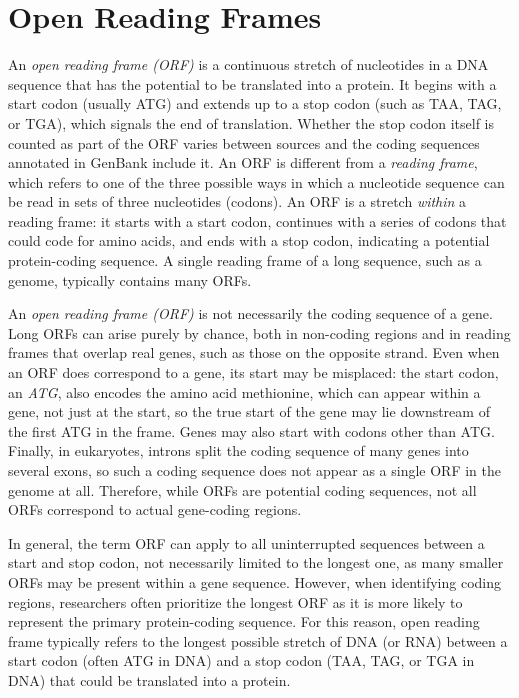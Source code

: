 \section{Open Reading Frames}

An {\em open reading frame (ORF)} is a continuous stretch of nucleotides in a DNA sequence that has the potential to be translated into a protein. It begins with a start codon (usually ATG) and extends up to a stop codon (such as TAA, TAG, or TGA), which signals the end of translation. Whether the stop codon itself is counted as part of the ORF varies between sources and the coding sequences annotated in GenBank include it. An ORF is different from a {\em reading frame}, which refers to one of the three possible ways in which a nucleotide sequence can be read in sets of three nucleotides (codons). An ORF is a stretch {\em within} a reading frame: it starts with a start codon, continues with a series of codons that could code for amino acids, and ends with a stop codon, indicating a potential protein-coding sequence. A single reading frame of a long sequence, such as a genome, typically contains many ORFs.

An {\em open reading frame (ORF)} is not necessarily the coding sequence of a gene. Long ORFs can arise purely by chance, both in non-coding regions and in reading frames that overlap real genes, such as those on the opposite strand. Even when an ORF does correspond to a gene, its start may be misplaced: the start codon, an {\em ATG}, also encodes the amino acid methionine, which can appear within a gene, not just at the start, so the true start of the gene may lie downstream of the first ATG in the frame. Genes may also start with codons other than ATG. Finally, in eukaryotes, introns split the coding sequence of many genes into several exons, so such a coding sequence does not appear as a single ORF in the genome at all. Therefore, while ORFs are potential coding sequences, not all ORFs correspond to actual gene-coding regions.


In general, the term ORF can apply to all uninterrupted sequences between a start and stop codon, not necessarily limited to the longest one, as many smaller ORFs may be present within a gene sequence. However, when identifying coding regions, researchers often prioritize the longest ORF as it is more likely to represent the primary protein-coding sequence. For this reason, open reading frame typically refers to the longest possible stretch of DNA (or RNA) between a start codon (often ATG in DNA) and a stop codon (TAA, TAG, or TGA in DNA) that could be translated into a protein. 


